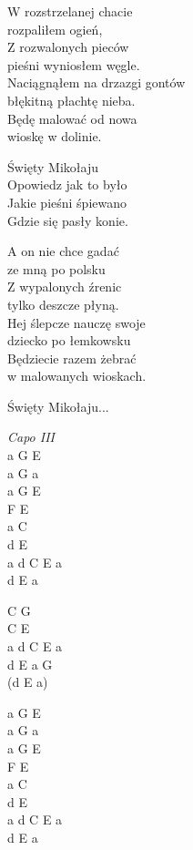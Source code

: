 \begin{text}
    \chordfill
    W rozstrzelanej chacie\\
    rozpaliłem ogień,\\
    Z rozwalonych pieców\\
    pieśni wyniosłem węgle.\\
    Naciągnąłem na drzazgi gontów\\
    błękitną płachtę nieba.\\
    Będę malować od nowa\\
    wioskę w dolinie.

    \vin Święty Mikołaju\\
    \vin Opowiedz jak to było\\
    \vin Jakie pieśni śpiewano\\
    \vin Gdzie się pasły konie.

    A on nie chce gadać\\
    ze mną po polsku\\
    Z wypalonych źrenic\\
    tylko deszcze płyną.\\
    Hej ślepcze nauczę swoje\\
    dziecko po łemkowsku\\
    Będziecie razem żebrać\\
    w malowanych wioskach.
    
    \vin Święty Mikołaju...
\end{text}
\begin{chord}
    \textit{Capo III}\\
    a G E\\
    a G a\\
    a G E\\
    F E\\
    a C\\
    d E\\
    a d C E a\\
    d E a

    C G\\
    C E\\
    a d C E a\\
    d E a G\\
    (d E a)
    
    a G E\\
    a G a\\
    a G E\\
    F E\\
    a C\\
    d E\\
    a d C E a\\
    d E a
\end{chord}